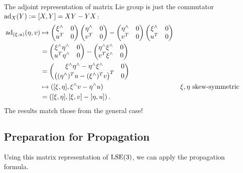 \documentclass[12pt,class=article,crop=false]{standalone}
\begin{document}
The adjoint representation of matrix Lie group is just the commutator $ \operatorname{ad}_{ X}(Y) := [X,Y] = XY - YX$: 
\begin{align*}
	\operatorname{ad}_{ ( \xi, u)} (\eta,v) &\mapsto  \begin{pmatrix} \xi^\wedge & 0\\u^{T}&0 \end{pmatrix}  \begin{pmatrix}  \eta^\wedge &0\\v^{T}&0 \end{pmatrix} - \begin{pmatrix}  \eta^\wedge &0\\v^{T}&0 \end{pmatrix} \begin{pmatrix} \xi^\wedge & 0\\u^{T}&0 \end{pmatrix}\\
				  &= \begin{pmatrix} \xi^\wedge \eta^\wedge & 0\\ u^{T} \eta^\wedge &0 \end{pmatrix} -  \begin{pmatrix} \eta^\wedge \xi^\wedge & 0\\ v^{T} \xi^\wedge &0 \end{pmatrix}  \\
				  &= \begin{pmatrix} \xi^\wedge \eta^\wedge - \eta^\wedge \xi^\wedge &0 \\ \left( (\eta^\wedge)^{T}u - (\xi^\wedge )^{T} v  \right)^{T} &0 \end{pmatrix}  \\
				  &\mapsto  \left( [ \xi, \eta], \xi^\wedge v - \eta^\wedge u  \right) && \xi, \eta \text{ skew-symmetric}  \\
				  &= \left( [ \xi, \eta], [\xi,v] - [\eta,u] \right)  .
\end{align*}
The results match those from the general case!

\subsection{Preparation for Propagation}
Using this matrix representation of $ \operatorname{LSE}(3)$, we can apply the propagation formula.
\end{document}
